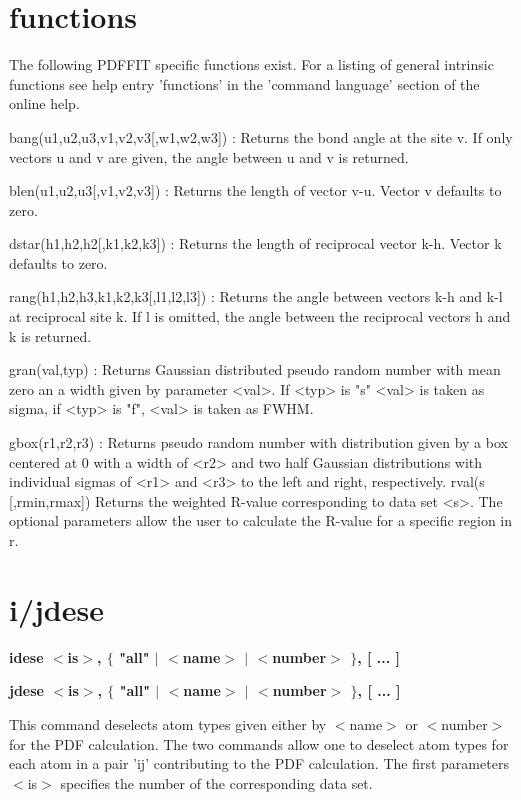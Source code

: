 \section{functions}
\par
The following PDFFIT specific functions exist. For a listing 
of general intrinsic functions see help entry 'functions' in 
the 'command language' section of the online help. 
\par
\begin{MacVerbatim}
bang(u1,u2,u3,v1,v2,v3[,w1,w2,w3]) :
    Returns the bond angle at the site v. If only vectors u and v
    are given, the angle between u and v is returned.

blen(u1,u2,u3[,v1,v2,v3]) :
    Returns the length of vector v-u. Vector v defaults to zero.

dstar(h1,h2,h2[,k1,k2,k3]) :
    Returns the length of reciprocal vector k-h. Vector k defaults
    to zero.

rang(h1,h2,h3,k1,k2,k3[,l1,l2,l3]) :
    Returns the angle between vectors k-h and k-l at reciprocal site k.
    If l is omitted, the angle between the reciprocal vectors h and k
    is returned.

gran(val,typ) :
    Returns Gaussian distributed pseudo random number with mean zero
    an a width given by parameter <val>. If <typ> is "s" <val> is taken
    as sigma, if <typ> is "f", <val> is taken as FWHM.

gbox(r1,r2,r3) :
    Returns pseudo random number with distribution given by a box
    centered at 0 with a width of <r2> and two half Gaussian
    distributions with individual sigmas of <r1> and <r3> to the
    left and right, respectively.
rval(s [,rmin,rmax])
    Returns the weighted R-value corresponding to data set <s>.
    The optional parameters allow the user to calculate the R-value
    for a specific region in r.
\end{MacVerbatim}
\section{i/jdese}
{\bf idese $ <$is$> $, $ \{$ "all" $| $ $ <$name$> $ $| $ $ <$number$> $ $\} $, [ ... ] \par }
{\bf jdese $ <$is$> $, $ \{$ "all" $| $ $ <$name$> $ $| $ $ <$number$> $ $\} $, [ ... ] \par }
\par
\vspace{3pt}
This command deselects atom types given either by $ <$name$> $ or $ <$number$> $ 
for the PDF calculation. The two commands allow one to deselect 
atom types for each atom in a pair 'ij' contributing to the PDF 
calculation. The first parameters $ <$is$> $ specifies the number of the 
corresponding data set. 
